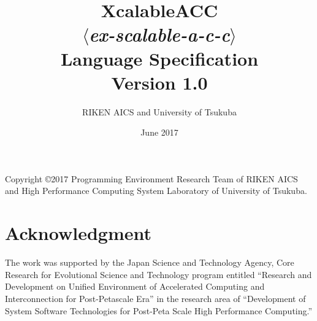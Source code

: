 \documentclass[a4paper,11pt,twoside]{report}
\title{{\Huge XcalableACC}\\
$\langle${\it ex-scalable-a-c-c}$\rangle$\\
Language Specification\\
\vspace{2cm}
Version 1.0\\}
\author{
\Large RIKEN AICS and University of Tsukuba\\
}
\date{\vspace{4cm}\Large June 2017}
\def\XMP{XcalableMP}
\begin{document}
\maketitle

Copyright \copyright 2017 Programming Environment Research Team of RIKEN AICS
and High Performance Computing System Laboratory of University of Tsukuba.

\clearpage

\cleardoublepage

\tableofcontents

\newpage
\mbox{}\newpage

\pagestyle{fancy}
\fancyhead{} %
\fancyhead[RE]{\leftmark}
\fancyhead[LO]{\rightmark}
\fancyhead[LE,RO]{\thepage}
\fancyfoot{} %
\renewcommand{\headrulewidth}{0pt}
\renewcommand{\footrulewidth}{0pt}

 \cleardoublepage
 \cleardoublepage
 \cleardoublepage
%

\cleardoublepage
\chapter*{Acknowledgment}

The work was supported by the Japan Science and Technology Agency, 
Core Research for Evolutional Science and Technology program entitled 
``Research and Development on Unified Environment of Accelerated Computing and Interconnection for Post-Petascale Era'' 
in the research area of ``Development of System Software Technologies for Post-Peta Scale High Performance Computing.''
\end{document}

